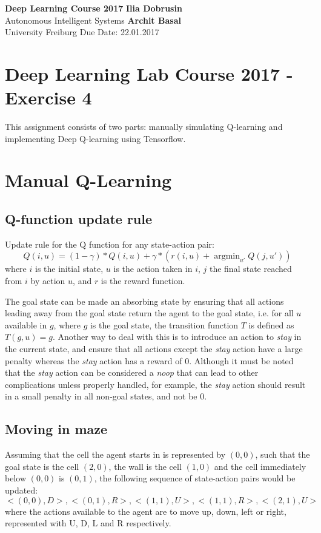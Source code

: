 \documentclass[a4paper, 11pt]{article}
\DeclareMathOperator*{\argmin}{argmin}
\begin{document}
\noindent
\large\textbf{Deep Learning Course 2017} \hfill \textbf{Ilia Dobrusin} \\
 Autonomous Intelligent Systems \hfill \textbf{Archit Basal} \\
 University Freiburg \hfill Due Date: 22.01.2017

\section*{Deep Learning Lab Course 2017 - Exercise 4}
This assignment consists of two parts: manually simulating Q-learning and implementing Deep Q-learning using Tensorflow. 

\section{Manual Q-Learning}
\subsection*{Q-function update rule}
 Update rule for the Q function for any state-action pair:
 \begin{equation*}
    Q(i, u) = (1 - \gamma) * Q(i, u) + \gamma * (r(i, u) + \argmin_{u'} Q(j, u'))    
  \end{equation*}
where $i$ is the initial state, $u$ is the action taken in $i$, $j$ the final state reached from $i$ by action $u$, and $r$ is the reward function.


The goal state can be made an absorbing state by ensuring that all actions leading away from the goal state return the agent to the goal state, i.e. for all $u$ available in $g$, where $g$ is the goal state, the transition function $T$ is defined as $T(g, u) = g$. Another way to deal with this is to introduce an action to \textit{stay} in the current state, and ensure that all actions except the \textit{stay} action have a large penalty whereas the \textit{stay} action has a reward of $0$. Although it must be noted that the \textit{stay} action can be considered a \textit{noop} that can lead to other complications unless properly handled, for example, the \textit{stay} action should result in a small penalty in all non-goal states, and not be $0$.

\subsection*{Moving in maze}
Assuming that the cell the agent starts in is represented by $(0,0)$, such that the goal state is the cell $(2,0)$, the wall is the cell $(1,0)$ and the cell immediately below $(0,0)$ is $(0,1)$, the following sequence of state-action pairs would be updated:
\begin{equation*}
<(0,0), D>, <(0,1), R>, <(1,1), U>, <(1,1), R>, <(2,1), U>
\end{equation*}
where the actions available to the agent are to move up, down, left or right, represented with U, D, L and R respectively.
\end{document}
